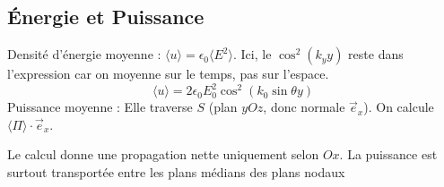 \documentclass[french]{yLectureNote}
\renewcommand{\vec}{\overrightarrow}
\begin{document}
\subsection{Énergie et Puissance}
Densité d'énergie moyenne : $\langle u \rangle = \epsilon_0 \langle E^2 \rangle$. Ici, le $\cos^2(k_y y)$ reste dans l'expression car on moyenne sur le temps, pas sur l'espace.
$$\langle u \rangle = 2\epsilon_0 E_0^2 \cos^2(k_0 \sin\theta y)$$
Puissance moyenne : Elle traverse $S$ (plan $yOz$, donc normale $\vec{e}_x$). On calcule $\langle \Pi \rangle \cdot \vec{e}_x$.

Le calcul donne une propagation nette uniquement selon $Ox$. La puissance est surtout transportée entre les plans médians des plans nodaux




\end{document}
